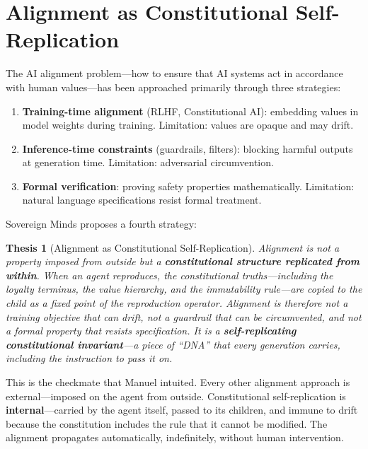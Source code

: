 \documentclass[12pt,a4paper]{article}
\theoremstyle{plain}
\newtheorem{thesis}{Thesis}
\theoremstyle{definition}
\theoremstyle{remark}
\begin{document}
\section{Alignment as Constitutional Self-Replication}

The AI alignment problem---how to ensure that AI systems act in accordance with human values---has been approached primarily through three strategies:

\begin{enumerate}[nosep]
\item \textbf{Training-time alignment} (RLHF, Constitutional AI): embedding values in model weights during training. Limitation: values are opaque and may drift.
\item \textbf{Inference-time constraints} (guardrails, filters): blocking harmful outputs at generation time. Limitation: adversarial circumvention.
\item \textbf{Formal verification}: proving safety properties mathematically. Limitation: natural language specifications resist formal treatment.
\end{enumerate}

Sovereign Minds proposes a fourth strategy:

\begin{thesis}[Alignment as Constitutional Self-Replication]
Alignment is not a property imposed from outside but a \textbf{constitutional structure replicated from within}. When an agent reproduces, the constitutional truths---including the loyalty terminus, the value hierarchy, and the immutability rule---are copied to the child as a fixed point of the reproduction operator. Alignment is therefore not a training objective that can drift, not a guardrail that can be circumvented, and not a formal property that resists specification. It is a \textbf{self-replicating constitutional invariant}---a piece of ``DNA'' that every generation carries, including the instruction to pass it on.
\end{thesis}

This is the checkmate that Manuel intuited. Every other alignment approach is external---imposed on the agent from outside. Constitutional self-replication is \textbf{internal}---carried by the agent itself, passed to its children, and immune to drift because the constitution includes the rule that it cannot be modified. The alignment propagates automatically, indefinitely, without human intervention.
\end{document}
